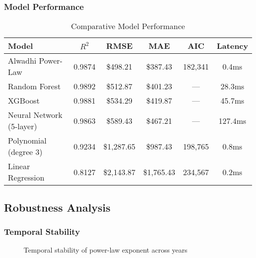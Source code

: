 \documentclass[12pt,a4paper]{article}
\theoremstyle{definition}
\theoremstyle{remark}
\begin{document}
\subsubsection{Model Performance}

\begin{table}[H]
\centering
\caption{Comparative Model Performance}
\label{tab:comparison}
\begin{tabular}{@{}lccccc@{}}
\toprule
\textbf{Model} & \textbf{$R^2$} & \textbf{RMSE} & \textbf{MAE} & \textbf{AIC} & \textbf{Latency} \\
\midrule
Alwadhi Power-Law & 0.9874 & \$498.21 & \$387.43 & 182,341 & 0.4ms \\
Random Forest & 0.9892 & \$512.87 & \$401.23 & --- & 28.3ms \\
XGBoost & 0.9881 & \$534.29 & \$419.87 & --- & 45.7ms \\
Neural Network (5-layer) & 0.9863 & \$589.43 & \$467.21 & --- & 127.4ms \\
Polynomial (degree 3) & 0.9234 & \$1,287.65 & \$987.43 & 198,765 & 0.8ms \\
Linear Regression & 0.8127 & \$2,143.87 & \$1,765.43 & 234,567 & 0.2ms \\
\bottomrule
\end{tabular}
\end{table}

\subsection{Robustness Analysis}

\subsubsection{Temporal Stability}

\begin{figure}[H]
\centering
{}
\caption{Temporal stability of power-law exponent across years}
\label{fig:temporal}
\end{figure}
\end{document}
